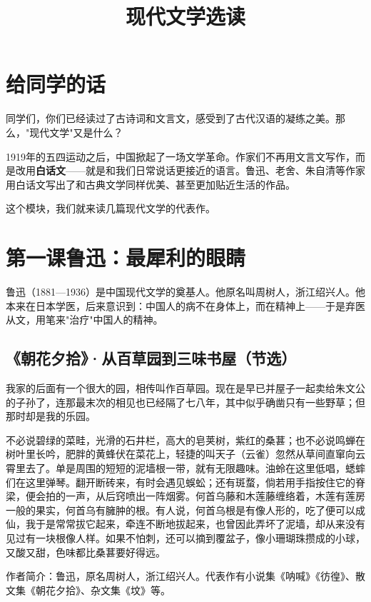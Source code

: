 \documentclass[a4paper,12pt]{ctexart}
\title{\textcolor{blue!70!black}{\Huge\textbf{现代文学选读}}}
\author{}
\date{}
\newcommand{\authorinfo}[1]{{\vspace{0.1cm}\noindent\textcolor{blue!60!black}{\small #1}\par}}
\begin{document}
\maketitle
\thispagestyle{empty}

\section*{\textcolor{blue!70!black}{给同学的话}}

同学们，你们已经读过了古诗词和文言文，感受到了古代汉语的凝练之美。那么，"现代文学"又是什么？

1919年的五四运动之后，中国掀起了一场文学革命。作家们不再用文言文写作，而是改用\textbf{白话文}——就是和我们日常说话更接近的语言。鲁迅、老舍、朱自清等作家用白话文写出了和古典文学同样优美、甚至更加贴近生活的作品。

这个模块，我们就来读几篇现代文学的代表作。

\newpage

\section{\textcolor{orange!80!black}{第一课\quad 鲁迅：最犀利的眼睛}}

鲁迅（1881—1936）是中国现代文学的奠基人。他原名叫周树人，浙江绍兴人。他本来在日本学医，后来意识到：中国人的病不在身体上，而在精神上——于是弃医从文，用笔来"治疗"中国人的精神。

\subsection*{《朝花夕拾》·从百草园到三味书屋（节选）}

我家的后面有一个很大的园，相传叫作百草园。现在是早已并屋子一起卖给朱文公的子孙了，连那最末次的相见也已经隔了七八年，其中似乎确凿只有一些野草；但那时却是我的乐园。

不必说碧绿的菜畦，光滑的石井栏，高大的皂荚树，紫红的桑葚；也不必说鸣蝉在树叶里长吟，肥胖的黄蜂伏在菜花上，轻捷的叫天子（云雀）忽然从草间直窜向云霄里去了。单是周围的短短的泥墙根一带，就有无限趣味。油蛉在这里低唱，蟋蟀们在这里弹琴。翻开断砖来，有时会遇见蜈蚣；还有斑蝥，倘若用手指按住它的脊梁，便会拍的一声，从后窍喷出一阵烟雾。何首乌藤和木莲藤缠络着，木莲有莲房一般的果实，何首乌有臃肿的根。有人说，何首乌根是有像人形的，吃了便可以成仙，我于是常常拔它起来，牵连不断地拔起来，也曾因此弄坏了泥墙，却从来没有见过有一块根像人样。如果不怕刺，还可以摘到覆盆子，像小珊瑚珠攒成的小球，又酸又甜，色味都比桑葚要好得远。

\authorinfo{作者简介：鲁迅，原名周树人，浙江绍兴人。代表作有小说集《呐喊》《彷徨》、散文集《朝花夕拾》、杂文集《坟》等。}
\end{document}
